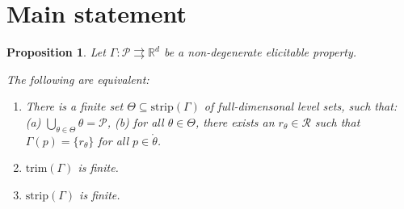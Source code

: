 \documentclass[12pt]{article}
\newcommand{\reals}{\mathbb{R}}
\renewcommand{\P}{\mathcal{P}}
\newcommand{\R}{\mathcal{R}}
\newcommand{\inter}[1]{\mathring{#1}}%
\newcommand{\toto}{\rightrightarrows}
\newcommand{\trim}{\mathrm{trim}}
\newcommand{\strip}{\mathrm{strip}}
\newtheorem{proposition}{Proposition}
\begin{document}
%
%
%
%
%




\section{Main statement}


\begin{proposition}\label{prop:optimal-reports-per-level-set}
  Let $\Gamma:\P\toto\reals^d$ be a non-degenerate elicitable property.

  The following are equivalent:
  \begin{enumerate}
  \item There is a finite set $\Theta \subseteq \strip(\Gamma)$ of full-dimensonal level sets, such that: (a) $\bigcup_{\theta\in\Theta} \theta = \P$, (b) for all $\theta \in \Theta$, there exists an $r_\theta \in \R$ such that $\Gamma(p) = \{r_\theta\}$ for all $p \in \inter{\theta}$.
  \item $\trim(\Gamma)$ is finite.
  \item $\strip(\Gamma)$ is finite.
  \end{enumerate}
\end{proposition}
\end{document}
